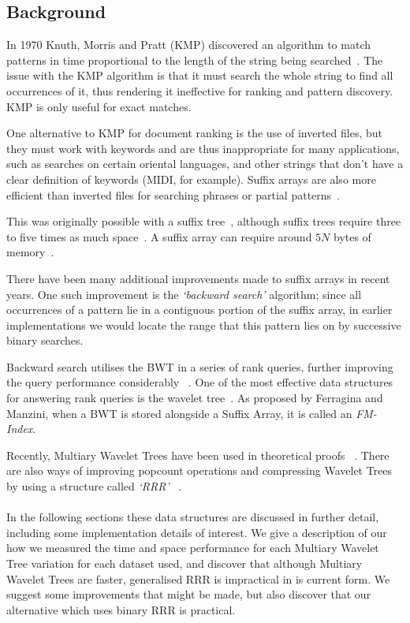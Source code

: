 \subsection{Background}
In 1970 Knuth, Morris and Pratt (KMP) discovered an algorithm to match patterns 
in time proportional to the length of the string being searched~\cite{KMP77, 
McCreight76}. The
issue with the KMP algorithm is that it must search the whole string to find all
occurrences of it, thus rendering it ineffective for ranking and pattern
discovery. KMP is only useful for exact matches.

One alternative to KMP for document ranking is the use of inverted files, but
they must work with keywords and are thus inappropriate for many applications,
such as searches on certain oriental languages, and other strings that don't
have a clear definition of keywords (MIDI, for example). Suffix arrays are also 
more efficient than inverted files for searching phrases or partial 
patterns~\cite{MN10}.

This was originally
possible with a suffix tree~\cite{McCreight76}, although suffix trees require
three to five times as much space~\cite{manber1990}. A suffix array can require
around $5N$ bytes of memory~\cite{manber1990}.

There have been many additional improvements made to suffix arrays
in recent years. One such improvement is the \emph{`backward search'} 
algorithm;
since all occurrences of a pattern lie in a contiguous portion of the suffix
array, in earlier implementations we would locate the range that this pattern
lies on by successive binary searches. 

Backward search utilises the BWT in a series of rank queries, further
improving the query performance considerably ~\cite{CN08, FGM09, FMMN07, GMR06,
MN07:rankselect, MN07:selfindex, MN10, MN06}. One of the most effective data
structures for answering rank queries is the wavelet tree~\cite{CN08, FGM09,
FMMN07, GGV03, MN07:selfindex}. As proposed by Ferragina and Manzini, when a BWT 
is stored alongside a Suffix Array, it is called an 
\emph{FM-Index}\cite{fmindex:ferragina2000}.

Recently, Multiary Wavelet Trees have been used in theoretical proofs
~\cite{FMMN07, yu2009}. There are also ways of improving popcount operations and
compressing Wavelet Trees by using a structure called \emph{`RRR'}
~\cite{rrr2007}.
\\ \\
In the following sections these data structures are discussed in further detail,
including some implementation details of interest. We give a description of our
how we measured the time and space performance for each Multiary Wavelet Tree 
variation for each dataset used, and discover that although Multiary Wavelet 
Trees are faster, generalised RRR is impractical in is current form. We suggest
some improvements that might be made, but also discover that our alternative 
which uses binary RRR is practical.
